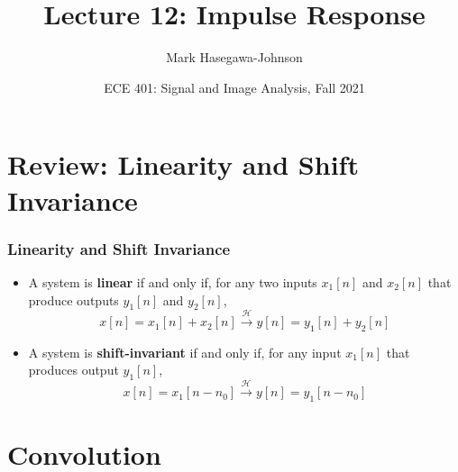 \documentclass{beamer}
\title{Lecture 12: Impulse Response}
\author{Mark Hasegawa-Johnson}
\date{ECE 401: Signal and Image Analysis, Fall 2021}
\begin{document}
\begin{frame}
  \maketitle
\end{frame}

\begin{frame}
  \tableofcontents
\end{frame}

\section[Review]{Review: Linearity and Shift Invariance}
\setcounter{subsection}{1}


\begin{frame}
  \frametitle{Linearity and Shift Invariance}
  \begin{itemize}
  \item A system is {\bf linear} if and only if, for any two inputs
    $x_1[n]$ and $x_2[n]$ that produce outputs $y_1[n]$ and $y_2[n]$,
    \[
    x[n]=x_1[n]+x_2[n] \stackrel{\mathcal H}{\longrightarrow}  y[n]=y_1[n]+y_2[n]
    \]
  \item A system is {\bf shift-invariant} if and only if, for any input
    $x_1[n]$ that produces output $y_1[n]$,
    \[
    x[n]=x_1[n-n_0] \stackrel{\mathcal H}{\longrightarrow}  y[n]=y_1[n-n_0]
    \]
  \end{itemize}
\end{frame}


\section[Convolution]{Convolution}
\setcounter{subsection}{1}
\end{document}
